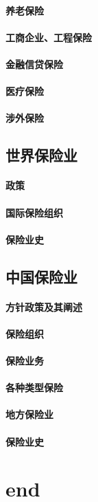\documentclass[UTF8]{../../RepresentationUniverse}
\begin{document}
\subsubsection{养老保险}
\subsubsection{工商企业、工程保险}
\subsubsection{金融信贷保险}
\subsubsection{医疗保险}
\subsubsection{涉外保险}

\section{世界保险业}
    \subsubsection{政策}
    \subsubsection{国际保险组织}
    \subsubsection{保险业史}

\section{中国保险业}
    \subsubsection{方针政策及其阐述}
    \subsubsection{保险组织}
    \subsubsection{保险业务}
    \subsubsection{各种类型保险}
    \subsubsection{地方保险业}
    \subsubsection{保险业史}


\chapter{end}
\end{document}
